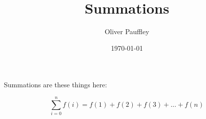 \documentclass[11pt]{article}
\author{Oliver Pauffley}
\date{\today}
\title{Summations}
\begin{document}
\maketitle
\tableofcontents

Summations are these things here:
\begin{latex}
\begin{equation}
\label{eq:1}
\sum_{i=0}^n f(i) = f(1) + f(2) + f(3) + ... + f(n)
\end{equation}
\end{latex}
\end{document}
